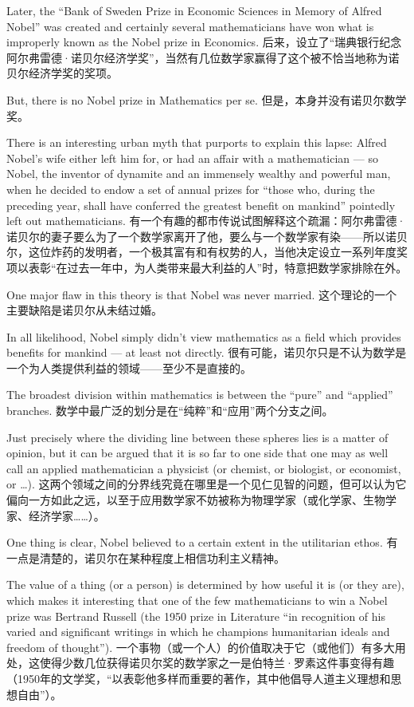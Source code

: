 Later, the 
``Bank of Sweden Prize in Economic Sciences in Memory of Alfred Nobel'' 
was created and certainly several mathematicians have won what is 
improperly known as the Nobel prize in Economics.
后来，设立了“瑞典银行纪念阿尔弗雷德·诺贝尔经济学奖”，当然有几位数学家赢得了这个被不恰当地称为诺贝尔经济学奖的奖项。

But, there is no 
Nobel prize in Mathematics per se.
但是，本身并没有诺贝尔数学奖。

There is an interesting urban myth that
purports to explain this lapse: Alfred Nobel's wife either left him for, or
had an affair with a mathematician --- so Nobel, the inventor of dynamite
and an immensely wealthy and powerful man, when he decided to endow 
a set of annual prizes for ``those who, during the preceding year, shall have conferred the greatest benefit on mankind'' pointedly left out mathematicians.
有一个有趣的都市传说试图解释这个疏漏：阿尔弗雷德·诺贝尔的妻子要么为了一个数学家离开了他，要么与一个数学家有染——所以诺贝尔，这位炸药的发明者，一个极其富有和有权势的人，当他决定设立一系列年度奖项以表彰“在过去一年中，为人类带来最大利益的人”时，特意把数学家排除在外。

One major flaw in this theory is that Nobel was never married.
这个理论的一个主要缺陷是诺贝尔从未结过婚。

In all likelihood, Nobel simply didn't view mathematics as a field
which provides benefits for mankind --- at least not directly.
很有可能，诺贝尔只是不认为数学是一个为人类提供利益的领域——至少不是直接的。

The broadest division within mathematics is between the ``pure''
and ``applied'' branches.
数学中最广泛的划分是在“纯粹”和“应用”两个分支之间。

Just precisely where the dividing line
between these spheres lies is a matter of opinion, but it can be
argued that it is so far to one side that one may as well call an
applied mathematician a physicist 
(or chemist, or biologist, or economist, or \ldots).
这两个领域之间的分界线究竟在哪里是一个见仁见智的问题，但可以认为它偏向一方如此之远，以至于应用数学家不妨被称为物理学家（或化学家、生物学家、经济学家……）。

One thing is
clear, Nobel believed to a certain extent in the utilitarian ethos.
有一点是清楚的，诺贝尔在某种程度上相信功利主义精神。

The value of a thing (or a person) is determined by how useful it is (or they 
are), which makes it interesting that one of the few mathematicians
to win a Nobel prize was Bertrand Russell (the 1950 prize in Literature
 ``in recognition of his varied and significant writings in which he 
champions humanitarian ideals and freedom of thought'').
一个事物（或一个人）的价值取决于它（或他们）有多大用处，这使得少数几位获得诺贝尔奖的数学家之一是伯特兰·罗素这件事变得有趣（1950年的文学奖，“以表彰他多样而重要的著作，其中他倡导人道主义理想和思想自由”）。

